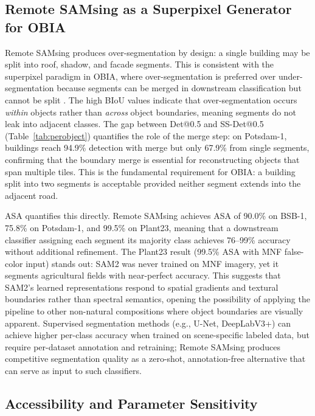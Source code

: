 \documentclass[review,11pt,authoryear]{elsarticle}
\begin{document}
\subsection{Remote SAMsing as a Superpixel Generator for OBIA}
\label{sec:disc_obia}

Remote SAMsing produces over-segmentation by design: a single building may be split into roof, shadow, and facade segments. This is consistent with the superpixel paradigm in OBIA, where over-segmentation is preferred over under-segmentation because segments can be merged in downstream classification but cannot be split \citep{blaschke2010obia, benz2004ecognition, baatz2000multiresolution}. The high BIoU values indicate that over-segmentation occurs \textit{within} objects rather than \textit{across} object boundaries, meaning segments do not leak into adjacent classes. The gap between Det@0.5 and SS-Det@0.5 (Table~\ref{tab:perobject}) quantifies the role of the merge step: on Potsdam-1, buildings reach 94.9\% detection with merge but only 67.9\% from single segments, confirming that the boundary merge is essential for reconstructing objects that span multiple tiles. This is the fundamental requirement for OBIA: a building split into two segments is acceptable provided neither segment extends into the adjacent road.

ASA \citep{stutz2018superpixels} quantifies this directly. Remote SAMsing achieves ASA of 90.0\% on BSB-1, 75.8\% on Potsdam-1, and 99.5\% on Plant23, meaning that a downstream classifier assigning each segment its majority class achieves 76--99\% accuracy without additional refinement. The Plant23 result (99.5\% ASA with MNF false-color input) stands out: SAM2 was never trained on MNF imagery, yet it segments agricultural fields with near-perfect accuracy. This suggests that SAM2's learned representations respond to spatial gradients and textural boundaries rather than spectral semantics, opening the possibility of applying the pipeline to other non-natural compositions where object boundaries are visually apparent. Supervised segmentation methods (e.g., U-Net, DeepLabV3+) can achieve higher per-class accuracy when trained on scene-specific labeled data, but require per-dataset annotation and retraining; Remote SAMsing produces competitive segmentation quality as a zero-shot, annotation-free alternative that can serve as input to such classifiers.

\subsection{Accessibility and Parameter Sensitivity}
\label{sec:disc_accessibility}
\end{document}
